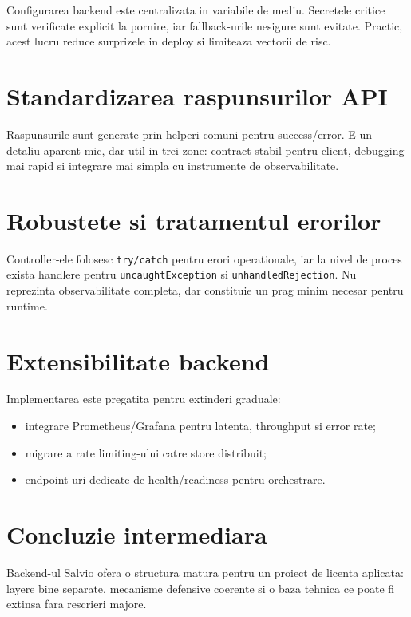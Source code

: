 Configurarea backend este centralizata in variabile de mediu. Secretele critice sunt verificate explicit la pornire, iar fallback-urile nesigure sunt evitate. Practic, acest lucru reduce surprizele in deploy si limiteaza vectorii de risc.

\section{Standardizarea raspunsurilor API}

Raspunsurile sunt generate prin helperi comuni pentru success/error. E un detaliu aparent mic, dar util in trei zone: contract stabil pentru client, debugging mai rapid si integrare mai simpla cu instrumente de observabilitate.

\section{Robustete si tratamentul erorilor}

Controller-ele folosesc \texttt{try/catch} pentru erori operationale, iar la nivel de proces exista handlere pentru \texttt{uncaughtException} si \texttt{unhandledRejection}. Nu reprezinta observabilitate completa, dar constituie un prag minim necesar pentru runtime.

\section{Extensibilitate backend}

Implementarea este pregatita pentru extinderi graduale:
\begin{itemize}[leftmargin=1.2cm]
    \item integrare Prometheus/Grafana pentru latenta, throughput si error rate;
    \item migrare a rate limiting-ului catre store distribuit;
    \item endpoint-uri dedicate de health/readiness pentru orchestrare.
\end{itemize}

\section{Concluzie intermediara}

Backend-ul Salvio ofera o structura matura pentru un proiect de licenta aplicata: layere bine separate, mecanisme defensive coerente si o baza tehnica ce poate fi extinsa fara rescrieri majore.
